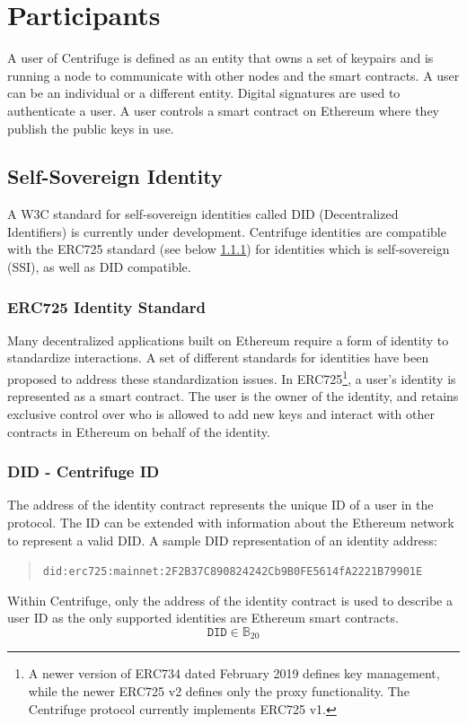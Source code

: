 \section{Participants}\label{sec:particpiants}
A user of Centrifuge is defined as an entity that owns a set of keypairs and is running a node to communicate with other nodes and the smart contracts. A user can be an individual or a different entity. Digital signatures are used to authenticate a user. A user controls a smart contract on Ethereum where they publish the public keys in use.

\subsection{Self-Sovereign Identity}\label{sec:identity_contract}
A W3C standard for self-sovereign identities called DID (Decentralized Identifiers)\cite{Decentra50:online} is currently under development. Centrifuge identities are compatible with the ERC725 standard (see below \ref{sec:erc725}) for identities which is self-sovereign (SSI), as well as DID compatible.

\subsubsection{ERC725 Identity Standard}\label{sec:erc725}
Many decentralized applications built on Ethereum require a form of identity to standardize interactions. A set of different standards for identities have been proposed to address these standardization issues\cite{EIPseip791:online}\cite{ERCLight27:online}. In ERC725\footnote{A newer version of ERC734 dated February 2019 defines key management, while the newer ERC725 v2 defines only the proxy functionality. The Centrifuge protocol currently implements ERC725 v1.}, a user's identity is represented as a smart contract. The user is the owner of the identity, and retains exclusive control over who is allowed to add new keys and interact with other contracts in Ethereum on behalf of the identity.
\subsubsection{DID - Centrifuge ID}\label{did}
The address of the identity contract represents the unique ID of a user in the protocol. The ID can be extended with information about the Ethereum network to represent a valid DID. A sample DID representation of an identity address\cite{rwot6san30:online}:
\begin{quote}\texttt{did:erc725:mainnet:2F2B37C890824242Cb9B0FE5614fA2221B79901E}\end{quote}
Within Centrifuge, only the address of the identity contract is used to describe a user ID as the only supported identities are Ethereum smart contracts.
\begin{equation}
        \mathtt{DID} \in \mathbb{B}_{20}
\end{equation}
